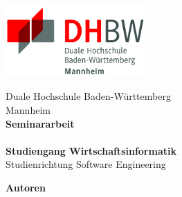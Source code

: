 \begin{titlepage}
    
    \begin{minipage}{\textwidth}
        \vspace{5em}
        \begin{center}
            \includegraphics[width=0.4\textwidth]{img/logo.jpg}
        \end{center}
    \end{minipage}
    \vspace{1em}
    \sffamily

    \begin{center}
        \textsf{\large{}Duale Hochschule Baden-W\"urttemberg\\[1.5mm] Mannheim}\\[2em]
        \textsf{\textbf{\Large{}Seminararbeit}}\\[3mm]
        \textsf{\textbf{\DerTitelDerArbeit}} \\[1.5cm]
        \textsf{\textbf{\Large{}Studiengang Wirtschaftsinformatik}\\[3mm] \textsf{Studienrichtung Software Engineering}}
        
        \vspace{10em}
    \end{center}
     
    \newpage



    \begin{center}
        \vspace{5em}
        \textbf{Autoren} \\
        \DerAutorDerArbeit
        \vspace{5em}
    \end{center}
       

\end{titlepage}
